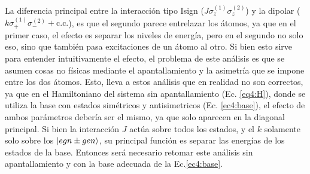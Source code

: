 La diferencia principal entre la interacción tipo Isign ($J\sigma_z^{(1)}\sigma_z^{(2)}$) y la dipolar ($k\sigma_+^{(1)}\sigma_-^{(2)}+\text{c.c.}$), es que el segundo parece entrelazar los átomos, ya que en el primer caso, el efecto es separar los niveles de energía, pero en el segundo no solo eso, sino que también pasa excitaciones de un átomo al otro. Si bien esto sirve para entender intuitivamente el efecto, el problema de este análisis es que se asumen cosas no físicas mediante el apantallamiento y la asimetría que se impone entre los dos átomos. Esto, lleva a estos análisis que en realidad no son correctos, ya que en el Hamiltoniano del sistema sin apantallamiento (Ec. \ref{eq4:H}), donde se utiliza la base con estados simétricos y antisimetricos (Ec. \ref{ec4:base}), el efecto de ambos parámetros debería ser el mismo, ya que solo aparecen en la diagonal principal. Si bien la interacción $J$ actúa sobre todos los estados, y el $k$ solamente solo sobre los $\ket{egn\pm gen}$, su principal función es separar las energías de los estados de la base.
Entonces será necesario retomar este análisis sin apantallamiento y con la base adecuada de la Ec.\ref{ec4:base}.
